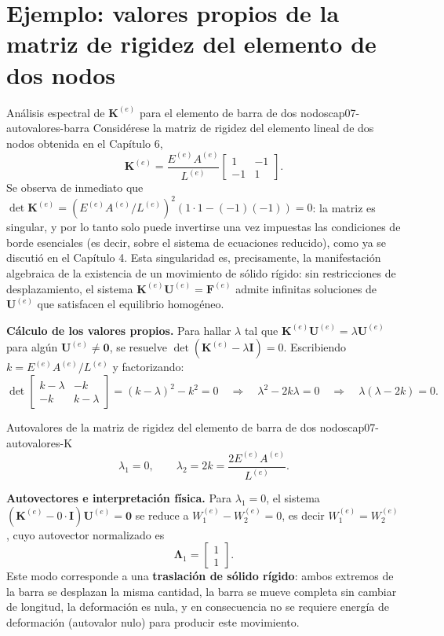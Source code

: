 \section{Ejemplo: valores propios de la matriz de rigidez del elemento de dos nodos}

\begin{ejemplo}{Análisis espectral de $\bm K^{(e)}$ para el elemento de barra de dos nodos}{cap07-autovalores-barra}
Considérese la matriz de rigidez del elemento lineal de dos nodos obtenida en el Capítulo 6,
\[
\bm K^{(e)} = \frac{E^{(e)}A^{(e)}}{L^{(e)}} \begin{bmatrix} 1 & -1 \\ -1 & 1 \end{bmatrix} .
\]
Se observa de inmediato que $\det\bm K^{(e)} = (E^{(e)}A^{(e)}/L^{(e)})^2(1\cdot 1 - (-1)(-1)) = 0$: la matriz es singular, y por lo tanto solo puede invertirse una vez impuestas las condiciones de borde esenciales (es decir, sobre el sistema de ecuaciones reducido), como ya se discutió en el Capítulo 4. Esta singularidad es, precisamente, la manifestación algebraica de la existencia de un movimiento de sólido rígido: sin restricciones de desplazamiento, el sistema $\bm K^{(e)}\bm U^{(e)}=\bm F^{(e)}$ admite infinitas soluciones de $\bm U^{(e)}$ que satisfacen el equilibrio homogéneo.

\textbf{Cálculo de los valores propios.} Para hallar $\lambda$ tal que $\bm K^{(e)}\bm U^{(e)}=\lambda\bm U^{(e)}$ para algún $\bm U^{(e)}\neq\bm 0$, se resuelve $\det(\bm K^{(e)}-\lambda\bm I)=0$. Escribiendo $k=E^{(e)}A^{(e)}/L^{(e)}$ y factorizando:
\[
\det\begin{bmatrix} k-\lambda & -k \\ -k & k-\lambda \end{bmatrix} = (k-\lambda)^2 - k^2 = 0 \quad\Longrightarrow\quad \lambda^2 - 2k\lambda = 0 \quad\Longrightarrow\quad \lambda(\lambda-2k)=0 .
\]

\begin{ecnimportante}{Autovalores de la matriz de rigidez del elemento de barra de dos nodos}{cap07-autovalores-K}
\[
\lambda_1 = 0, \qquad \lambda_2 = 2k = \frac{2E^{(e)}A^{(e)}}{L^{(e)}} .
\]
\end{ecnimportante}

\textbf{Autovectores e interpretación física.} Para $\lambda_1=0$, el sistema $(\bm K^{(e)}-0\cdot\bm I)\bm U^{(e)}=\bm 0$ se reduce a $W_1^{(e)}-W_2^{(e)}=0$, es decir $W_1^{(e)}=W_2^{(e)}$, cuyo autovector normalizado es
\[
\bm\Lambda_1 = \begin{bmatrix}1\\1\end{bmatrix} .
\]
Este modo corresponde a una \textbf{traslación de sólido rígido}: ambos extremos de la barra se desplazan la misma cantidad, la barra se mueve completa sin cambiar de longitud, la deformación es nula, y en consecuencia no se requiere energía de deformación (autovalor nulo) para producir este movimiento.


\end{ejemplo}
